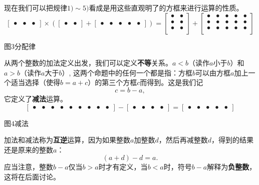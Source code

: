 现在我们可以把规律$1)\sim5)$看成是用这些直观明了的方框来进行运算的性质。
\begin{equation*}
\begin{bmatrix} \bullet &\bullet &\bullet \end{bmatrix} \times
\left(\begin{bmatrix} \bullet &\bullet\end{bmatrix}+ 
\begin{bmatrix} \bullet &\bullet &\bullet &\bullet &\bullet\end{bmatrix}\right) =
\begin{bmatrix} \bullet &\bullet \\ \bullet &\bullet \\ \bullet &\bullet \\ \end{bmatrix} + 
\begin{bmatrix}
\bullet &\bullet &\bullet &\bullet &\bullet \\
\bullet &\bullet &\bullet &\bullet &\bullet \\
\bullet &\bullet &\bullet &\bullet &\bullet \\
\end{bmatrix}
\end{equation*}
\begin{center}
图$3$\quad 分配律
\end{center}

从两个整数的加法定义出发，我们可以定义\textbf{不等}关系。$a<b$（读作$a$小于$b$）和$a>b$（读作$a$大于$b$）,
这两个命题中的任何一个都是指：方框$b$可以由方框$a$加上一个适当选择（使得$b=a+c$）的第三个方框$c$而得到。这是我们记
\begin{equation*}
c=b-a,
\end{equation*}
它定义了\textbf{减法}运算。
\begin{equation*}
\begin{bmatrix} \bullet &\bullet &\bullet &\bullet &\bullet &\bullet &\bullet &\bullet
&\bullet\end{bmatrix} - 
\begin{bmatrix} \bullet &\bullet &\bullet &\bullet\end{bmatrix} = 
\begin{bmatrix} \bullet &\bullet &\bullet &\bullet &\bullet\end{bmatrix}
\end{equation*}
\begin{center}
图$4$\quad 减法
\end{center}

加法和减法称为\textbf{互逆}运算，因为如果整数$a$加整数$d$，然后再减整数$d$，得到的结果还是原来的整数$a$：
\begin{equation*}
(a+d)-d=a.
\end{equation*}
应当注意，整数$b-a$仅当$b>a$时才有定义，当$b<a$时，符号$b-a$解释为\textbf{负整数}，这将在后面讨论。

